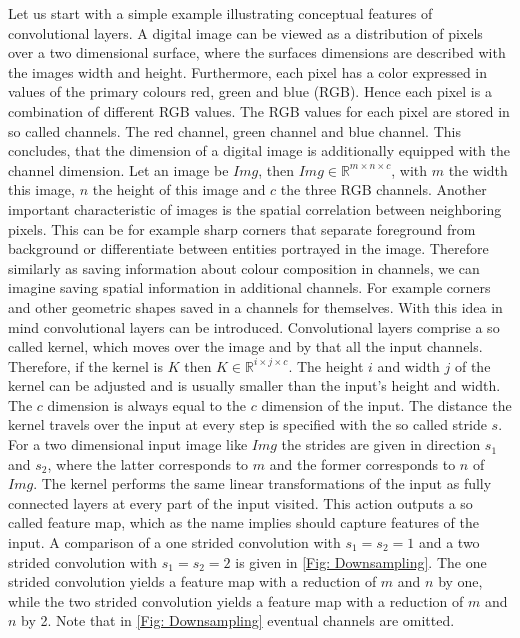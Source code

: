 Let us start with a simple example illustrating conceptual features of convolutional layers. A digital image can be viewed as a distribution of pixels over a two dimensional surface, where the surfaces dimensions are described with the images width and height. Furthermore, each pixel has a color expressed in values of the primary colours red, green and blue (RGB). Hence each pixel is a combination of different RGB values. The RGB values for each pixel are stored in so called channels. The red channel, green channel and blue channel. This concludes, that the dimension of a digital image is additionally equipped with the channel dimension. Let an image be \(Img\), then  \(Img \in \mathbb{R}^{m\times n\times c}\), with \(m\) the width this image, \(n\) the height of this image and \(c\) the three RGB channels. Another important characteristic of images is the spatial correlation between neighboring pixels. This can be for example sharp corners that separate foreground from background or differentiate between entities portrayed in the image. Therefore similarly as saving information about colour composition in channels, we can imagine saving spatial information in additional channels. For example corners and other geometric shapes saved in a channels for themselves. With this idea in mind convolutional layers can be introduced. Convolutional layers comprise a so called kernel, which moves over the image and by that all the input channels. Therefore, if the kernel is $K$ then $K \in \mathbb{R}^{i\times j\times c}$. The height $i$ and width $j$ of the kernel can be adjusted and is usually smaller than the input's height and width. The $c$ dimension is always equal to the $c$ dimension of the input. The distance the kernel travels over the input at every step is specified with the so called stride $s$. For a two dimensional input image like $Img$ the strides are given in direction $s_1$  and $s_2$, where the latter corresponds to $m$ and the former corresponds to $n$ of $Img$. The kernel performs the same linear transformations of the input as fully connected layers at every part of the input visited. This action outputs a so called feature map, which as the name implies should capture features of the input. A comparison of a one strided convolution with $s_1=s_2=1$ and a two strided convolution with $s_1=s_2=2$ is given in \cref{Fig: Downsampling}. The one strided convolution yields a feature map with a reduction of $m$ and $n$ by one, while the two strided convolution yields a feature map with a reduction of $m$ and $n$ by 2. Note that in \cref{Fig: Downsampling} eventual channels are omitted.
